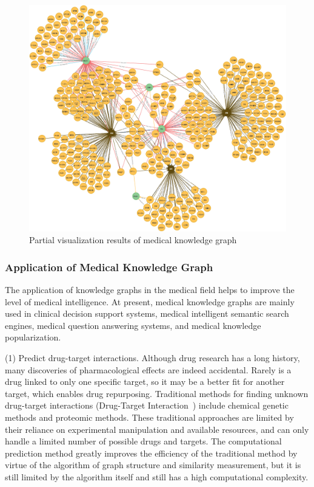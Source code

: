 \begin{figure}[ht]
\centering
\includegraphics[width=1\textwidth]{images/3.3.2.png}
\caption{\label{fig:frog2}Partial visualization results of medical knowledge graph}
\end{figure}

\subsubsection{Application of Medical Knowledge Graph}

The application of knowledge graphs in the medical field helps to improve the level of medical intelligence. At present, medical knowledge graphs are mainly used in clinical decision support systems, medical intelligent semantic search engines, medical question answering systems, and medical knowledge popularization.

(1) Predict drug-target interactions. Although drug research has a long history, many discoveries of pharmacological effects are indeed accidental. Rarely is a drug linked to only one specific target, so it may be a better fit for another target, which enables drug repurposing. Traditional methods for finding unknown drug-target interactions (Drug-Target Interaction~\cite{Y2008Prediction}) include chemical genetic methods and proteomic methods. These traditional approaches are limited by their reliance on experimental manipulation and available resources, and can only handle a limited number of possible drugs and targets. The computational prediction method greatly improves the efficiency of the traditional method by virtue of the algorithm of graph structure and similarity measurement, but it is still limited by the algorithm itself and still has a high computational complexity.

